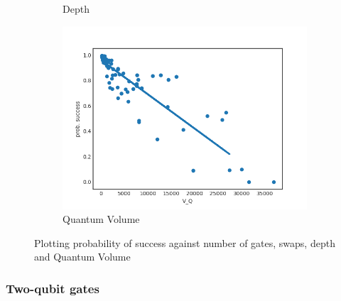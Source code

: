 \documentclass[11pt]{article}
\begin{document}
\begin{figure}[H]
\begin{subfigure}[b]{0.5\linewidth}
    \caption{Depth} 
    \label{fig:ps_d_3000} 
  \end{subfigure}%
  \begin{subfigure}[b]{0.5\linewidth}
    \centering
    \includegraphics[width=0.75\linewidth]{ps_q_3000_0_005} 
    \caption{Quantum Volume} 
    \label{fig:ps_q_3000} 
  \end{subfigure} 
  \caption{Plotting probability of success against number of gates, swaps, depth and Quantum Volume}
  \label{fig:ps_3000} 
\end{figure}




\subsubsection{Two-qubit gates}
\label{sec:org2032514}
\end{document}
